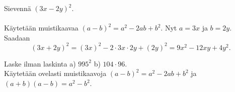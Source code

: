 \begin{esimerkki}
Sievennä $(3x-2y)^2$. \\
\quad\\
Käytetään muistikaavaa $(a-b)^2 = a^2-2ab+b^2$. Nyt $a = 3x$ ja $b = 2y$.
Saadaan
        \[ (3x+2y)^2 = (3x)^2-2\cdot 3x\cdot 2y+(2y)^2 = 9x^2-12xy+4y^2. \]
\end{esimerkki}

\begin{esimerkki}
Laske ilman laskinta a) $995^2$ b) $104 \cdot 96$. \\
Käytetään ovelasti muistikaavoja $(a-b)^2 = a^2-2ab+b^2$ ja \mbox{$(a+b)(a-b) = a^2-b^2$}.
\begin{alakohdat}
\end{alakohdat}
\end{esimerkki}

